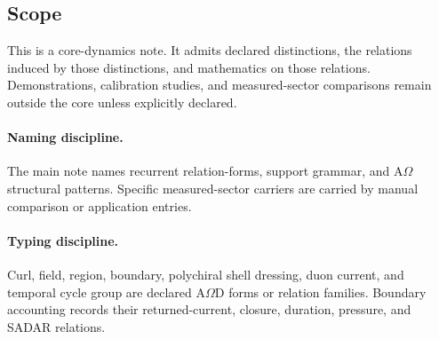 \subsection{Scope}\label{subsec:intro-scope}
This is a core-dynamics note. It admits declared distinctions, the relations induced by those distinctions, and mathematics on those relations. Demonstrations, calibration studies, and measured-sector comparisons remain outside the core unless explicitly declared.

\paragraph{Naming discipline.}
The main note names recurrent relation-forms, support grammar, and A\(\Omega\) structural patterns. Specific measured-sector carriers are carried by manual comparison or application entries.

\paragraph{Typing discipline.}
Curl, field, region, boundary, polychiral shell dressing, duon current, and temporal cycle group are declared A\(\Omega\)D forms or relation families. Boundary accounting records their returned-current, closure, duration, pressure, and SADAR relations.
